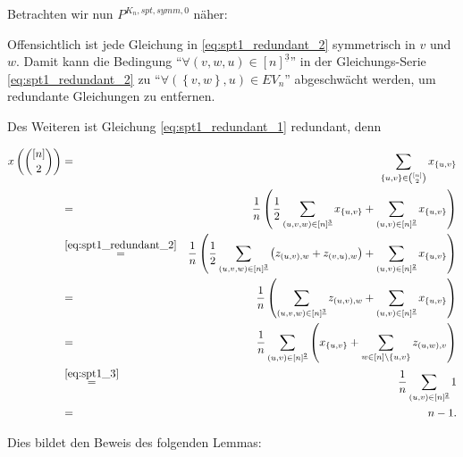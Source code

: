 \documentclass[10p,a4paper,BCOR = 12mm, DIV=15]{scrbook}
\begin{document}
Betrachten wir nun $P^{K_n, spt, symm, 0}$ näher:

Offensichtlich ist jede Gleichung in \eqref{eq:spt1_redundant_2} symmetrisch in $v$ und $w$. Damit kann die Bedingung "`$\forall \left(v, w, u\right)\in [n]^{\underline{3}}$"' in der Gleichungs-Serie \eqref{eq:spt1_redundant_2} zu "`$\forall \left(\left\{v, w\right\}, u\right)\in EV_n$"' abgeschwächt werden, um redundante Gleichungen zu entfernen.

Des Weiteren ist Gleichung \eqref{eq:spt1_redundant_1} redundant, denn
{
\allowdisplaybreaks
\begin{eqnarray*}
x\left({\left[n\right] \choose 2}\right) & = & \sum_{\left\{u, v\right\} \in {\left[n\right] \choose 2}} x_{\left\{u, v\right\}} \\
& = & \frac{1}{n} \left(\frac{1}{2} \sum_{\left(u, v, w\right) \in \left[n\right]^{\underline{3}}} x_{\left\{u, v\right\}} + \sum_{\left(u, v\right) \in \left[n\right]^{\underline{2}}} x_{\left\{u, v\right\}} \right) \\
& \stackrel{\eqref{eq:spt1_redundant_2}}{=} & \frac{1}{n} \left(\frac{1}{2} \sum_{\left(u, v, w\right) \in \left[n\right]^{\underline{3}}} \left(z_{\left(u, v\right), w} + z_{\left(v, u\right), w}\right) + \sum_{\left(u, v\right) \in \left[n\right]^{\underline{2}}} x_{\left\{u, v\right\}} \right) \\
& = & \frac{1}{n} \left(\sum_{\left(u, v, w\right) \in \left[n\right]^{\underline{3}}} z_{\left(u, v\right), w} + \sum_{\left(u, v\right) \in \left[n\right]^{\underline{2}}} x_{\left\{u, v\right\}} \right) \\
& = & \frac{1}{n} \sum_{\left(u, v\right) \in \left[n\right]^{\underline{2}}} \left( x_{\left\{u, v\right\}} + \sum_{w \in \left[n\right] \backslash \left\{u, v\right\}} z_{\left(u, w\right), v} 
\right) \\
& \stackrel{\eqref{eq:spt1_3}}{=} & \frac{1}{n} \sum_{\left(u, v\right) \in \left[n\right]^{\underline{2}}} 1 \\
& = & n-1.
\end{eqnarray*}

Dies bildet den Beweis des folgenden Lemmas:

}
\end{document}
